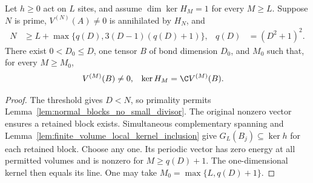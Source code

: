 \begin{lemma}
    \label{lem:prime_small_representation_fixed_tensor}
    \leanok
    Let $h\ge0$ act on $L$ sites, and assume $\dim\ker H_M=1$ for every
    $M\ge L$. Suppose $N$ is prime, $V^{(N)}(A)\ne0$ is annihilated by
    $H_N$, and
    \begin{align}
        N & \ge L+\max\{q(D),3(D-1)(q(D)+1)\},
          & q(D)                               & =(D^2+1)^2.
        \label{eq:prime_small_representation_threshold}
    \end{align}
    There exist $0<D_0\le D$, one tensor $B$ of bond dimension $D_0$, and
    $M_0$ such that, for every $M\ge M_0$,
    \begin{align}
        V^{(M)}(B) & \ne0,
                   & \ker H_M & =\C V^{(M)}(B).
        \label{eq:prime_small_representation_fixed_tensor}
    \end{align}
\end{lemma}
\begin{proof}\leanok
    The threshold gives $D<N$, so primality permits
    Lemma~\ref{lem:normal_blocks_no_small_divisor}. The original nonzero vector
    ensures a retained block exists. Simultaneous complementary spanning
    and Lemma~\ref{lem:finite_volume_local_kernel_inclusion} give
    $G_L(B_j)\subseteq\ker h$ for each retained block. Choose any one.
    Its periodic vector has zero energy at all permitted volumes and is
    nonzero for $M\ge q(D)+1$. The one-dimensional kernel then equals its line.
    One may take $M_0=\max\{L,q(D)+1\}$.
\end{proof}


